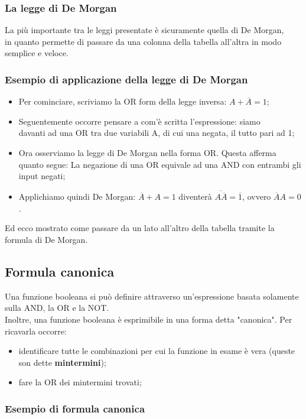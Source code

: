 \documentclass[12pt]{article}
\begin{document}
\subsubsection{La legge di De Morgan}
La più importante tra le leggi presentate è sicuramente quella di De Morgan,\\
in quanto permette di passare da una colonna della tabella all'altra in modo semplice e veloce.
\subsubsection{Esempio di applicazione della legge di De Morgan}
\begin{itemize}
    \item Per cominciare, scriviamo la OR form della legge inversa: $A + \overline{A} = 1$;
    \item Seguentemente occorre pensare a com'è scritta l'espressione: siamo\\davanti ad una OR tra due variabili A, di cui una negata, il tutto pari ad 1;
    \item Ora osserviamo la legge di De Morgan nella forma OR. Questa afferma quanto segue: La negazione di una OR equivale ad una AND con entrambi gli input negati;
    \item Applichiamo quindi De Morgan: $\overline{A} + A = 1$ diventerà $\overline{A\overline{A}} = \overline{1}$, ovvero $\overline{A}A = 0$.
\end{itemize}
Ed ecco mostrato come passare da un lato all'altro della tabella tramite la formula di De Morgan.
\subsection{Formula canonica}
Una funzione booleana si può definire attraverso un'espressione basata solamente sulla AND, la OR e la NOT.\\
Inoltre, una funzione booleana è esprimibile in una forma detta "canonica". Per ricavarla occorre:
\begin{itemize}
    \item identificare tutte le combinazioni per cui la funzione in esame è vera (queste son dette \textbf{mintermini});
    \item fare la OR dei mintermini trovati;
\end{itemize}
\subsubsection{Esempio di formula canonica}
\end{document}
